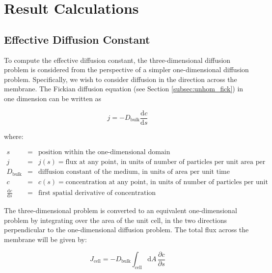 
\section{Result Calculations}

\subsection{Effective Diffusion Constant}\label{subsec:D_eff}

To compute the effective diffusion constant,
the three-dimensional diffusion problem is considered from the perspective of a simpler one-dimensional diffusion problem.
Specifically, we wish to consider diffusion in the direction across the membrane.
The Fickian diffusion equation (see Section \ref{subsec:unhom_fick}) in one dimension can be written as

\begin{equation}\label{eq:fickslaw_1D}
j = - D_{\mathrm{bulk}} \frac{\mathrm{d}c}{\mathrm{d}s}
\end{equation}

where:

$\begin{array}{rcl}
s & = & \text{position within the one-dimensional domain} \\
j & = & j(s) = \text{flux at any point, in units of number of particles per unit area per unit time} \\
D_{\text{bulk}} & = & \text{diffusion constant of the medium, in units of area per unit time} \\
c & = & c(s) = \text{concentration at any point, in units of number of particles per unit volume} \\
\frac{\mathrm{d}c}{\mathrm{d}s} & = & \text{first spatial derivative of concentration}
\end{array}$

The three-dimensional problem is converted to an equivalent one-dimensional problem
by integrating over the area of the unit cell, in the two directions perpendicular to
the one-dimensional diffusion problem.
The total flux across the membrane will be given by:

\begin{equation}
J_{\mathrm{cell}} = - D_{\mathrm{bulk}}\int_{\mathrm{cell}} \mathrm{d}A\, \frac{\partial c}{\partial s}
\end{equation}

